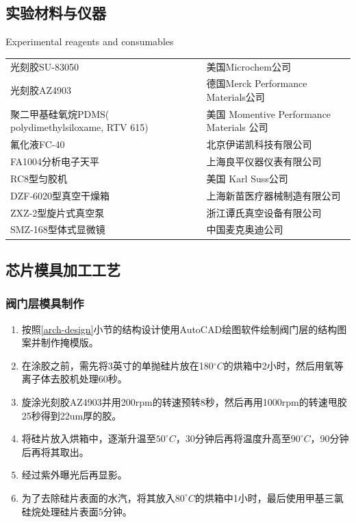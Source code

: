 \subsection{实验材料与仪器}
	\begin{table}[htbp]
	\centering
    {Experimental reagents and consumables}
	\begin{tabular}{p{150pt}p{230pt}}
	\toprule
		光刻胶SU-83050 & 美国Microchem公司\\
		光刻胶AZ4903 & 德国Merck Performance Materials公司\\
		聚二甲基硅氧烷PDMS( polydimethylsiloxame, RTV 615) &美国 Momentive Performance Materials 公司\\
		氟化液FC-40 & 北京伊诺凯科技有限公司\\
		FA1004分析电子天平 & 上海良平仪器仪表有限公司\\
		RC8型匀胶机 & 美国 Karl Suss公司\\
		DZF-6020型真空干燥箱& 上海新苗医疗器械制造有限公司\\
		ZXZ-2型旋片式真空泵 & 浙江谭氏真空设备有限公司\\
		SMZ-168型体式显微镜& 中国麦克奥迪公司 \\
	\bottomrule
	\end{tabular}
	\end{table}
\subsection{芯片模具加工工艺}
\subsubsection{阀门层模具制作}
	
	\begin{enumerate}[label={\alph*)},font={\color{black!50!black}\bfseries}]
	\item 按照\ref{arch-design}小节的结构设计使用AutoCAD绘图软件绘制阀门层的结构图案并制作掩模版。
	\item 在涂胶之前，需先将3英寸的单抛硅片放在180$^\circ C$的烘箱中2小时，然后用氧等离子体去胶机处理60秒。
	\item 旋涂光刻胶AZ4903并用200rpm的转速预转8秒，然后再用1000rpm的转速甩胶25秒得到22um厚的胶。
	\item 将硅片放入烘箱中，逐渐升温至$50^\circ C$，30分钟后再将温度升高至$90^\circ C$，90分钟后再将其取出。
	\item 经过紫外曝光后再显影。
	\item 为了去除硅片表面的水汽，将其放入$80^\circ C$的烘箱中1小时，最后使用甲基三氯硅烷处理硅片表面5分钟。
	\end{enumerate}
	
